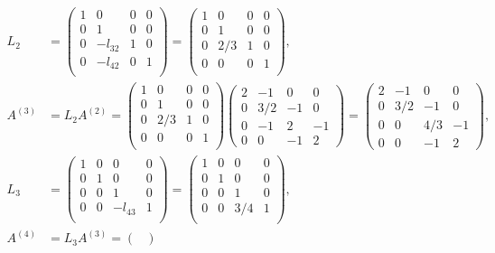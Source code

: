 \documentclass[english, parskip=full]{scrartcl}
\begin{document}
\begin{align}
L_2 &= \begin{pmatrix}
1 & 0 & 0 & 0 \\
0 & 1 & 0 & 0 \\
0 & -l_{32} & 1 & 0 \\
0 & -l_{42} & 0 & 1 \\
\end{pmatrix} = \begin{pmatrix}
1 & 0 & 0 & 0 \\
0 & 1 & 0 & 0 \\
0 & 2/3 & 1 & 0 \\
0 & 0 & 0 & 1 \\
\end{pmatrix},\\
A^{(3)} &= L_2A^{(2)} = \begin{pmatrix}
1 & 0 & 0 & 0 \\
0 & 1 & 0 & 0 \\
0 & 2/3 & 1 & 0 \\
0 & 0 & 0 & 1 \\
\end{pmatrix}\begin{pmatrix}
2 & -1 & 0 & 0 \\
0 & 3/2 & -1 & 0 \\
0 & -1 & 2 & -1 \\
0 & 0 & -1 & 2
\end{pmatrix} = \begin{pmatrix}
2 & -1 & 0 & 0 \\
0 & 3/2 & -1 & 0 \\
0 & 0 & 4/3 & -1 \\
0 & 0 & -1 & 2
\end{pmatrix},\\
L_3 &= \begin{pmatrix}
1 & 0 & 0 & 0 \\
0 & 1 & 0 & 0 \\
0 & 0 & 1 & 0 \\
0 & 0 & -l_{43} & 1 \\
\end{pmatrix} = \begin{pmatrix}
1 & 0 & 0 & 0 \\
0 & 1 & 0 & 0 \\
0 & 0 & 1 & 0 \\
0 & 0 & 3/4 & 1 \\
\end{pmatrix},\\
A^{(4)} &= L_3A^{(3)} = \begin{pmatrix}

\end{pmatrix}
\end{align}
\end{document}
